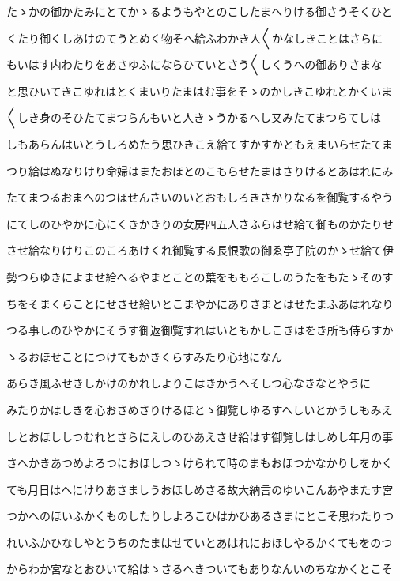 \documentclass[a4paper,11pt,landscape]{ltjtarticle}
\begin{document}
たゝかの御かたみにとてかゝるようもやとのこしたまへりける御さうそくひと
\par\medskip
くたり御くしあけのてうとめく物そへ給ふわかき人〱かなしきことはさらに
\par\medskip
もいはす内わたりをあさゆふにならひていとさう〱しくうへの御ありさまな
\par\medskip
と思ひいてきこゆれはとくまいりたまはむ事をそゝのかしきこゆれとかくいま
\par\medskip
〱しき身のそひたてまつらんもいと人きゝうかるへし又みたてまつらてしは
\par\medskip
しもあらんはいとうしろめたう思ひきこえ給てすかすかともえまいらせたてま
\par\medskip
つり給はぬなりけり命婦はまたおほとのこもらせたまはさりけるとあはれにみ
\par\medskip
たてまつるおまへのつほせんさいのいとおもしろきさかりなるを御覧するやう
\par\medskip
にてしのひやかに心にくきかきりの女房四五人さふらはせ給て御ものかたりせ
\par\medskip
させ給なりけりこのころあけくれ御覧する長恨歌の御ゑ亭子院のかゝせ給て伊
\par\medskip
勢つらゆきによませ給へるやまとことの葉をももろこしのうたをもたゝそのす
\par\medskip
ちをそまくらことにせさせ給いとこまやかにありさまとはせたまふあはれなり
\par\medskip
つる事しのひやかにそうす御返御覧すれはいともかしこきはをき所も侍らすか
\par\medskip
ゝるおほせことにつけてもかきくらすみたり心地になん
\par\medskip
あらき風ふせきしかけのかれしよりこはきかうへそしつ心なきなとやうに
\par\medskip
みたりかはしきを心おさめさりけるほとゝ御覧しゆるすへしいとかうしもみえ
\par\medskip
しとおほししつむれとさらにえしのひあえさせ給はす御覧しはしめし年月の事
\par\medskip
さへかきあつめよろつにおほしつゝけられて時のまもおほつかなかりしをかく
\par\medskip
ても月日はへにけりあさましうおほしめさる故大納言のゆいこんあやまたす宮
\par\medskip
つかへのほいふかくものしたりしよろこひはかひあるさまにとこそ思わたりつ
\par\medskip
れいふかひなしやとうちのたまはせていとあはれにおほしやるかくてもをのつ
\par\medskip
からわか宮なとおひいて給はゝさるへきついてもありなんいのちなかくとこそ
\end{document}
